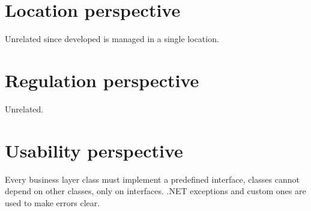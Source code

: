 \section{Location perspective}

Unrelated since developed is managed in a single location.

\section{Regulation perspective}

Unrelated.

\section{Usability perspective}

Every business layer class must implement a predefined interface, classes cannot depend on other classes, only on interfaces. .NET exceptions and custom ones are used to make errors clear. 
